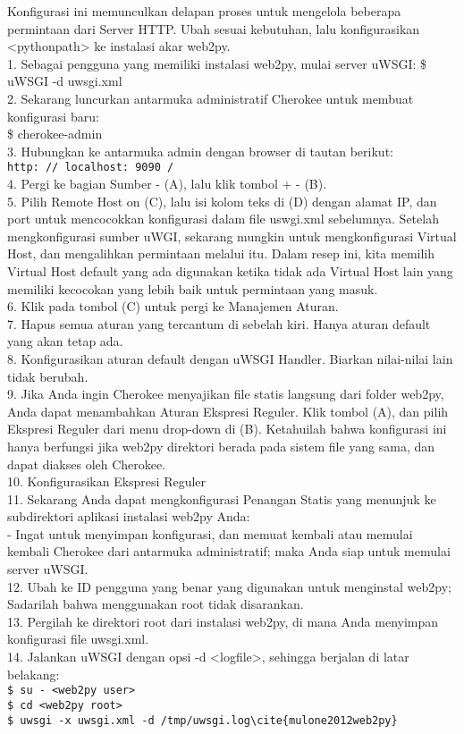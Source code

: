 	Konfigurasi ini memunculkan delapan proses untuk mengelola beberapa permintaan dari
Server HTTP. Ubah sesuai kebutuhan, lalu konfigurasikan <pythonpath> ke instalasi
akar web2py.\\
1.	Sebagai pengguna yang memiliki instalasi web2py, mulai server uWSGI: \$ uWSGI -d uwsgi.xml\\
2.	Sekarang luncurkan antarmuka administratif Cherokee untuk membuat konfigurasi baru:\\
\$ cherokee-admin\\
3.	Hubungkan ke antarmuka admin dengan browser di tautan berikut:\\
\verb|http: // localhost: 9090 /|\\
4.	Pergi ke bagian Sumber - (A), lalu klik tombol + - (B).\\
5.	Pilih Remote Host on (C), lalu isi kolom teks di (D) dengan alamat IP, dan port untuk mencocokkan konfigurasi dalam file uswgi.xml sebelumnya. Setelah mengkonfigurasi sumber uWGI, sekarang mungkin untuk mengkonfigurasi Virtual Host, dan mengalihkan permintaan melalui itu. Dalam resep ini, kita memilih Virtual Host default yang ada digunakan ketika tidak ada Virtual Host lain yang memiliki kecocokan yang lebih baik untuk permintaan yang masuk.\\
6.	Klik pada tombol (C) untuk pergi ke Manajemen Aturan.\\
7.	Hapus semua aturan yang tercantum di sebelah kiri. Hanya aturan default yang akan tetap ada.\\
8.	Konfigurasikan aturan default dengan uWSGI Handler. Biarkan nilai-nilai lain tidak berubah.\\
9.	Jika Anda ingin Cherokee menyajikan file statis langsung dari folder web2py, Anda dapat menambahkan Aturan Ekspresi Reguler. Klik tombol (A), dan pilih Ekspresi Reguler dari menu drop-down di (B). Ketahuilah bahwa konfigurasi ini hanya berfungsi jika web2py direktori berada pada sistem file yang sama, dan dapat diakses oleh Cherokee.\\
10.	Konfigurasikan Ekspresi Reguler\\
11.	Sekarang Anda dapat mengkonfigurasi Penangan Statis yang menunjuk ke subdirektori aplikasi instalasi web2py Anda:\\
-	Ingat untuk menyimpan konfigurasi, dan memuat kembali atau memulai kembali Cherokee dari antarmuka administratif; maka Anda siap untuk memulai server uWSGI.\\
12.	Ubah ke ID pengguna yang benar yang digunakan untuk menginstal web2py; Sadarilah bahwa menggunakan root tidak disarankan.\\
13.	Pergilah ke direktori root dari instalasi web2py, di mana Anda menyimpan konfigurasi file uwsgi.xml.\\
14.	Jalankan uWSGI dengan opsi -d <logfile>, sehingga berjalan di latar belakang:\\
\verb|$ su - <web2py user>|\\
\verb|$ cd <web2py root>|\\
\verb|$ uwsgi -x uwsgi.xml -d /tmp/uwsgi.log\cite{mulone2012web2py}|\\


